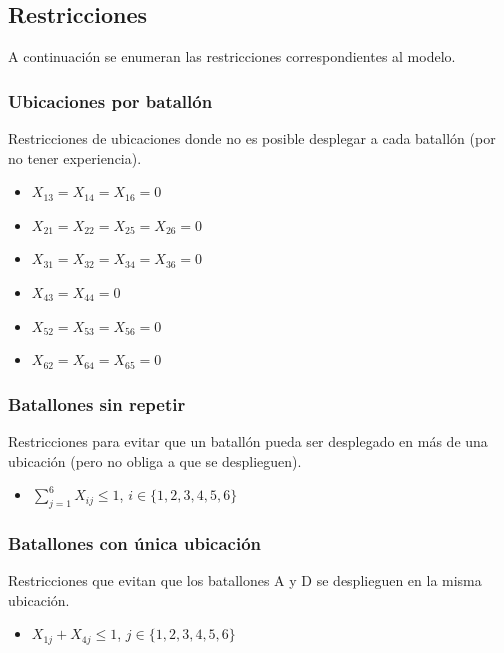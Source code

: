 \documentclass[12pt]{article}
\begin{document}
\subsection{Restricciones}

A continuación se enumeran las restricciones correspondientes al modelo.

\subsubsection{Ubicaciones por batallón}

Restricciones de ubicaciones donde no es posible desplegar a cada batallón (por no tener experiencia).

\begin{itemize}
    \item $X_{13} = X_{14} = X_{16} = 0$
    \item $X_{21} = X_{22} = X_{25} = X_{26} = 0$
    \item $X_{31} = X_{32} = X_{34} = X_{36} = 0$
    \item $X_{43} = X_{44} = 0$
    \item $X_{52} = X_{53} = X_{56} = 0$
    \item $X_{62} = X_{64} = X_{65} = 0$
\end{itemize}

\subsubsection{Batallones sin repetir}

Restricciones para evitar que un batallón pueda ser desplegado en más de una ubicación (pero no obliga a que se desplieguen).

\begin{itemize}
    \item $\sum_{j=1}^{6} X_{ij} \leq 1$, $i \in \{1,2,3,4,5,6\} $
\end{itemize}

\subsubsection{Batallones con única ubicación}

Restricciones que evitan que los batallones A y D se desplieguen en la misma ubicación.

\begin{itemize}
    \item $X_{1j} + X_{4j} \leq 1$, $j \in \{1,2,3,4,5,6\}$
\end{itemize}
\end{document}
